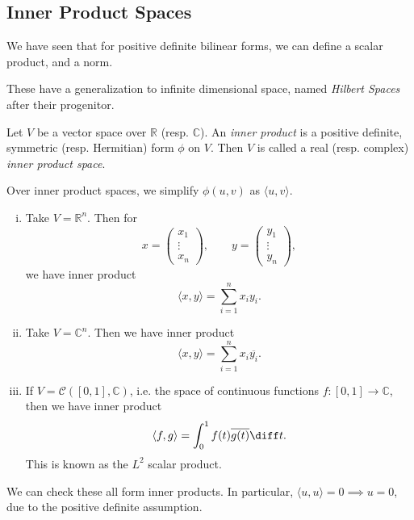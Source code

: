 \documentclass[12pt]{article}
\begin{document}
\subsection{Inner Product Spaces}
\label{sub:inner_product_spaces}

We have seen that for positive definite bilinear forms, we can define a scalar product, and a norm.

These have a generalization to infinite dimensional space, named \textit{Hilbert Spaces} after their progenitor.

\begin{definition}
	Let $V$ be a vector space over $\mathbb{R}$ (resp. $\mathbb{C}$). An \textit{inner product} is a positive definite, symmetric (resp. Hermitian) form $\phi$ on $V$. Then $V$ is called a real (resp. complex) \textit{inner product space}.
\end{definition}

Over inner product spaces, we simplify $\phi(u, v)$ as $\langle u, v \rangle$.

\begin{exbox}
	\begin{enumerate}[(i)]
		\item Take $V = \mathbb{R}^{n}$. Then for
			\[
			x =
			\begin{pmatrix}
				x_1 \\
				\vdots \\
				x_n
			\end{pmatrix}
			, \qquad y =
			\begin{pmatrix}
				y_1 \\
				\vdots \\
				y_n
			\end{pmatrix}
			,\]
			we have inner product
			\[
				\langle x, y \rangle = \sum_{i = 1}^{n} x_i y_i
			.\]
		\item Take $V = \mathbb{C}^{n}$. Then we have inner product
			\[
			\langle x, y\rangle = \sum_{i = 1}^{n} x_i \overline{y_i}
			.\]
		\item If $V = \mathcal{C}([0, 1], \mathbb{C})$, i.e. the space of continuous functions $f : [0, 1] \to \mathbb{C}$, then we have inner product
			\[
			\langle f, g \rangle = \int_{0}^{1}f(t) \overline{g(t)} \diff t
			.\]
			This is known as the $L^{2}$ scalar product.
	\end{enumerate}
	We can check these all form inner products. In particular, $\langle u, u \rangle = 0 \implies u = 0$, due to the positive definite assumption.
\end{exbox}
\end{document}
